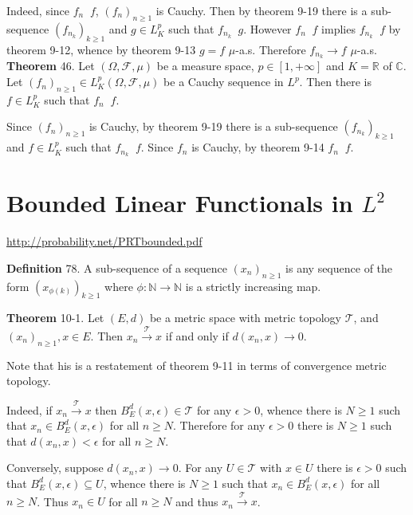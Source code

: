 \documentclass[a4paper]{article}
\newcommand{\clo}[1]{\left [ #1 \right ]}
\newcommand{\brac}[1]{\left ( #1 \right )}
\newcommand{\Real}{\mathbb{R}}
\newcommand{\Cplx}{\mathbb{C}}
\newcommand{\Tcal}{\mathcal{T}}
\newcommand{\Fcal}{\mathcal{F}}
\newcommand{\lpto}{\mathop{\overset{L^p}{\to}}\nolimits}
\begin{document}
Indeed, since $f_n\lpto f$, $\brac{f_n}_{n\geq 1}$ is Cauchy. Then by theorem 9-19 there is a sub-sequence $\brac{f_{n_k}}_{k\geq 1}$ and $g\in L^p_K$ such that $f_{n_k}\lpto g$. However $f_n\lpto f$ implies $f_{n_k}\lpto f$ by theorem 9-12, whence by theorem 9-13 $g=f$ $\mu$-a.s. Therefore $f_{n_k}\to f$ $\mu$-a.s.\\

\label{thm:cauchy_lpto} \noindent \textbf{Theorem} 46.
Let $\brac{\Omega, \Fcal, \mu}$ be a measure space, $p\in \clo{1,+\infty}$ and $K=\Real$ of $\Cplx$. Let $\brac{f_n}_{n\geq 1}\in L^p_K\brac{\Omega, \Fcal, \mu}$ be a Cauchy sequence in $L^p$. Then there is $f\in L^p_K$ such that $f_n\lpto f$.

Since $\brac{f_n}_{n\geq 1}$ is Cauchy, by theorem 9-19 there is a sub-sequence $\brac{f_{n_k}}_{k\geq 1}$ and $f\in L^p_K$ such that $f_{n_k}\lpto f$. Since $f_n$ is Cauchy, by theorem 9-14 $f_n\lpto f$.\\


\section{Bounded Linear Functionals in $L^2$} %
\label{sec:tut_10}
\url{http://probability.net/PRTbounded.pdf}

\noindent \textbf{Definition} 78.
A sub-sequence of a sequence $\brac{x_n}_{n\geq 1}$ is any sequence of the form $\brac{x_{\phi\brac{k}}}_{k\geq 1}$ where $\phi:\mathbb{N}\to\mathbb{N}$ is a strictly increasing map.

\label{thm:conv_equ} \noindent \textbf{Theorem} 10-1.
Let $\brac{E,d}$ be a metric space with metric topology $\Tcal$, and $\brac{x_n}_{n\geq 1}, x\in E$. Then $x_n\overset{\Tcal}{\to}x$ if and only if $d\brac{x_n, x}\to 0$.

Note that his is a restatement of theorem 9-11 in terms of convergence metric topology.

Indeed, if $x_n\overset{\Tcal}{\to} x$ then $B^d_E\brac{x, \epsilon}\in \Tcal$ for any $\epsilon > 0$, whence there is $N\geq 1$ such that $x_n\in B^d_E\brac{x, \epsilon}$ for all $n\geq N$. Therefore for any $\epsilon>0$ there is $N\geq 1$ such that $d\brac{x_n,x}<\epsilon$ for all $n\geq N$.

Conversely, suppose $d\brac{x_n,x}\to 0$. For any $U\in \Tcal$ with $x\in U$ there is $\epsilon>0$ such that $B^d_E\brac{x, \epsilon}\subseteq U$, whence there is $N\geq 1$ such that $x_n\in B^d_E\brac{x,\epsilon}$ for all $n\geq N$. Thus $x_n\in U$ for all $n\geq N$ and thus $x_n\overset{\Tcal}{\to} x$.\\
\end{document}
